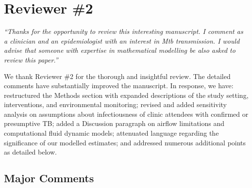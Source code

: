 \documentclass[11pt]{article}
\begin{document}
\clearpage

\section*{Reviewer \#2}

\noindent\textit{``Thanks for the opportunity to review this interesting manuscript. I comment as a clinician and an epidemiologist with an interest in Mtb transmission. I would advise that someone with expertise in mathematical modelling be also asked to review this paper.''}

\medskip
\noindent We thank Reviewer \#2 for the thorough and insightful review. The detailed comments have substantially improved the manuscript. In response, we have: restructured the Methods section with expanded descriptions of the study setting, interventions, and environmental monitoring; revised and added sensitivity analysis on assumptions about infectiousness of clinic attendees with confirmed or presumptive TB; added a Discussion paragraph on airflow limitations and computational fluid dynamic models; attenuated language regarding the significance of our modelled estimates; and addressed numerous additional points as detailed below.

\subsection*{Major Comments}
\end{document}
